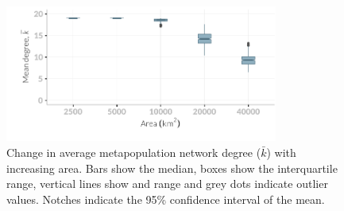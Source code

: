 \begin{knitrout}\footnotesize
{}\color{fgcolor}\begin{figure}[t]

{\centering \includegraphics[width=0.8\textwidth]{figure/plotK-1} 

}

\caption[Change in average network degree with increasing area]{
Change in average metapopulation network degree ($\bar{k}$) with increasing area. 
Bars show the median, boxes show the interquartile range, vertical lines show and range and grey dots indicate outlier values.
Notches indicate the 95\% confidence interval of the mean.
}\label{fig:plotK}
\end{figure}


\end{knitrout}





